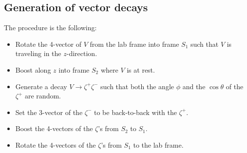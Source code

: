 \documentclass[12pt]{article}
\begin{document}
\subsection{Generation of vector decays}

The procedure is the following:

\begin{itemize}
  \item Rotate the 4-vector of $V$ from the lab frame into frame
    $S_1$ such that $V$ is traveling in the $z$-direction.
  \item  Boost along $z$ into frame $S_2$ where $V$ is at rest.
  \item Generate a decay $V \to \zeta^+ \zeta^-$ such that
    both the angle $\phi$ and the $\cos \theta$ of the $\zeta^+$ are random.
  \item   Set the 3-vector of the $\zeta^-$ to be back-to-back with the $\zeta^+$.
  \item Boost the 4-vectors of the $\zeta$'s from $S_2$ to $S_1$.
\item Rotate the 4-vectors of the $\zeta$'s from $S_1$ to the lab frame.
\end{itemize}
\end{document}
